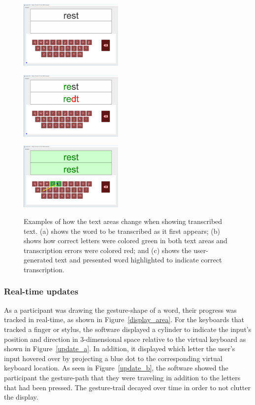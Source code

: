 \begin{figure}[!b]
	\centering
	\begin{minipage}[t]{1.9in}
		\includegraphics[width=2in]{Figures/fig_idle_keyboard}
		\label{text_a}
	\end{minipage}
	\begin{minipage}[t]{1.9in}
		\includegraphics[width=2in]{Figures/fig_error_keyboard}
		\label{text_b}
	\end{minipage}
	\begin{minipage}[t]{1.9in}
		\includegraphics[width=2in]{Figures/fig_correct_keyboard}
		\label{text_c}
	\end{minipage}
	\caption[Display: Text Area]{Examples of how the text areas change when showing transcribed text. (a) shows the word to be transcribed as it first appears; (b) shows how correct letters were colored green in both text areas and transcription errors were colored red; and (c) shows the user-generated text and presented word highlighted to indicate correct transcription.}
	\label{text_area}
\end{figure}

\subsubsection{Real-time updates}
As a participant was drawing the gesture-shape of a word, their progress was tracked in real-time, as shown in Figure~\ref{display_area}. For the keyboards that tracked a finger or stylus, the software displayed a cylinder to indicate the input's position and direction in 3-dimensional space relative to the virtual keyboard as shown in Figure~\ref{update_a}. In addition, it displayed which letter the user's input hovered over by projecting a blue dot to the corresponding virtual keyboard location. As seen in Figure~\ref{update_b}, the software showed the participant the gesture-path that they were traveling in addition to the letters that had been pressed. The gesture-trail decayed over time in order to not clutter the display. 


